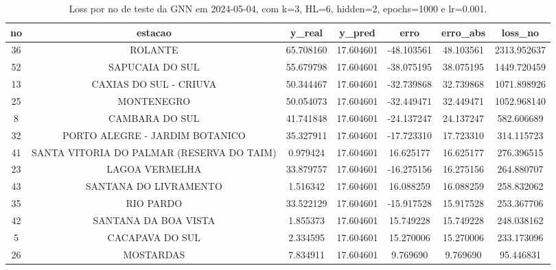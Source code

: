 \begin{table}[h]
\centering
\caption{Loss por no de teste da GNN em 2024-05-04, com k=3, HL=6, hidden=2, epochs=1000 e lr=0.001.}
\label{tab:gnn_loss_k3_hl6_h2_e1000_d20240504}
\begin{tabular}{ccccccc}
\toprule
no & estacao & y\_real & y\_pred & erro & erro\_abs & loss\_no \\
\midrule
36 & ROLANTE & 65.708160 & 17.604601 & -48.103561 & 48.103561 & 2313.952637 \\
52 & SAPUCAIA DO SUL & 55.679798 & 17.604601 & -38.075195 & 38.075195 & 1449.720459 \\
13 & CAXIAS DO SUL - CRIUVA & 50.344467 & 17.604601 & -32.739868 & 32.739868 & 1071.898926 \\
25 & MONTENEGRO & 50.054073 & 17.604601 & -32.449471 & 32.449471 & 1052.968140 \\
8 & CAMBARA DO SUL & 41.741848 & 17.604601 & -24.137247 & 24.137247 & 582.606689 \\
32 & PORTO ALEGRE - JARDIM BOTANICO & 35.327911 & 17.604601 & -17.723310 & 17.723310 & 314.115723 \\
41 & SANTA VITORIA DO PALMAR (RESERVA DO TAIM) & 0.979424 & 17.604601 & 16.625177 & 16.625177 & 276.396515 \\
23 & LAGOA VERMELHA & 33.879757 & 17.604601 & -16.275156 & 16.275156 & 264.880707 \\
43 & SANTANA DO LIVRAMENTO & 1.516342 & 17.604601 & 16.088259 & 16.088259 & 258.832062 \\
35 & RIO PARDO & 33.522129 & 17.604601 & -15.917528 & 15.917528 & 253.367706 \\
42 & SANTANA DA BOA VISTA & 1.855373 & 17.604601 & 15.749228 & 15.749228 & 248.038162 \\
5 & CACAPAVA DO SUL & 2.334595 & 17.604601 & 15.270006 & 15.270006 & 233.173096 \\
26 & MOSTARDAS & 7.834911 & 17.604601 & 9.769690 & 9.769690 & 95.446831 \\
\bottomrule
\end{tabular}
\end{table}
